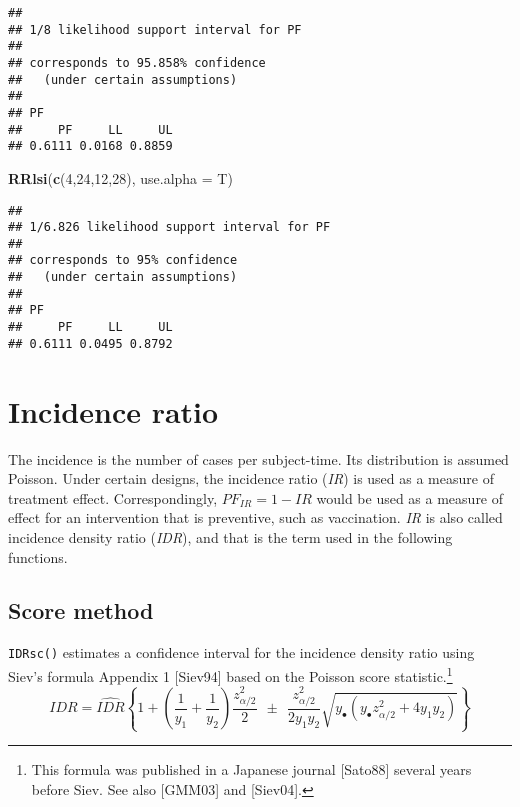 \documentclass[]{article}
\newenvironment{Shaded}{\begin{snugshade}}{\end{snugshade}}
\newcommand{\KeywordTok}[1]{\textcolor[rgb]{0.13,0.29,0.53}{\textbf{{#1}}}}
\newcommand{\DataTypeTok}[1]{\textcolor[rgb]{0.13,0.29,0.53}{{#1}}}
\newcommand{\DecValTok}[1]{\textcolor[rgb]{0.00,0.00,0.81}{{#1}}}
\newcommand{\NormalTok}[1]{{#1}}
\let\rmarkdownfootnote\footnote%
\def\footnote{\protect\rmarkdownfootnote}
\begin{document}
\begin{verbatim}
## 
## 1/8 likelihood support interval for PF 
## 
## corresponds to 95.858% confidence
##   (under certain assumptions)
## 
## PF 
##     PF     LL     UL 
## 0.6111 0.0168 0.8859
\end{verbatim}

\begin{Shaded}
\begin{Highlighting}[]
\KeywordTok{RRlsi}\NormalTok{(}\KeywordTok{c}\NormalTok{(}\DecValTok{4}\NormalTok{,}\DecValTok{24}\NormalTok{,}\DecValTok{12}\NormalTok{,}\DecValTok{28}\NormalTok{), }\DataTypeTok{use.alpha =} \NormalTok{T)}
\end{Highlighting}
\end{Shaded}

\begin{verbatim}
## 
## 1/6.826 likelihood support interval for PF 
## 
## corresponds to 95% confidence
##   (under certain assumptions)
## 
## PF 
##     PF     LL     UL 
## 0.6111 0.0495 0.8792
\end{verbatim}

\section{Incidence ratio}

The incidence is the number of cases per subject-time. Its distribution
is assumed Poisson. Under certain designs, the incidence ratio
(\emph{IR}) is used as a measure of treatment effect. Correspondingly,
\({{PF}_{IR}}=1-IR\) would be used as a measure of effect for an
intervention that is preventive, such as vaccination. \emph{IR} is also
called incidence density ratio (\emph{IDR}), and that is the term used
in the following functions.

\subsection{Score method}

\texttt{IDRsc()} estimates a confidence interval for the incidence
density ratio using Siev's formula Appendix 1 {[}Siev94{]} based on the
Poisson score
statistic.\footnote{This formula was published in a Japanese journal [Sato88] several years before Siev. See also [GMM03] and [Siev04].}
\[IDR=\widehat{IDR}\left\{ 1+\left( \frac{1}{{{y}_{1}}}+\frac{1}{{{y}_{2}}} \right)\frac{z_{\alpha /2}^{2}}{2}\ \ \pm \ \ \frac{z_{\alpha /2}^{2}}{2{{y}_{1}}{{y}_{2}}}\sqrt{{{y}_{\bullet }}\left( {{y}_{\bullet }}z_{\alpha /2}^{2}+4{{y}_{1}}{{y}_{2}} \right)} \right\}\]
\end{document}
